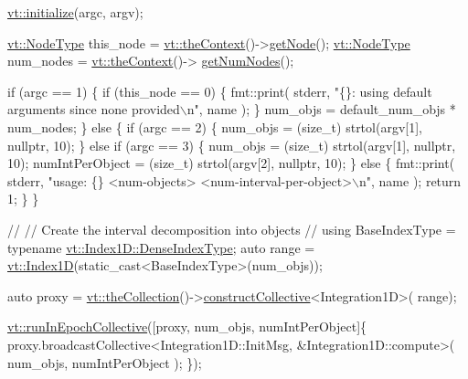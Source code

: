 \begin{DoxyCodeInclude}
  \hyperlink{namespacevt_aaa266774ea8339c58be0202b00fafa62}{vt::initialize}(argc, argv);

  \hyperlink{namespacevt_a866da9d0efc19c0a1ce79e9e492f47e2}{vt::NodeType} this\_node = \hyperlink{namespacevt_a26551fe0e6e6a1371111df5b12c7e92c}{vt::theContext}()->\hyperlink{structvt_1_1ctx_1_1_context_a0d52c263ce8516546a67443d9a86fa5f}{getNode}();
  \hyperlink{namespacevt_a866da9d0efc19c0a1ce79e9e492f47e2}{vt::NodeType} num\_nodes = \hyperlink{namespacevt_a26551fe0e6e6a1371111df5b12c7e92c}{vt::theContext}()->
      \hyperlink{structvt_1_1ctx_1_1_context_a7f41071aadf6d5fa9e1b6c703c5ff19d}{getNumNodes}();

  \textcolor{keywordflow}{if} (argc == 1) \{
    \textcolor{keywordflow}{if} (this\_node == 0) \{
      fmt::print(
        stderr, \textcolor{stringliteral}{"\{\}: using default arguments since none provided\(\backslash\)n"}, name
      );
    \}
    num\_objs = default\_num\_objs * num\_nodes;
  \} \textcolor{keywordflow}{else} \{
    \textcolor{keywordflow}{if} (argc == 2) \{
      num\_objs = (size\_t) strtol(argv[1], \textcolor{keyword}{nullptr}, 10);
    \}
    \textcolor{keywordflow}{else} \textcolor{keywordflow}{if} (argc == 3) \{
      num\_objs = (size\_t) strtol(argv[1], \textcolor{keyword}{nullptr}, 10);
      numIntPerObject = (size\_t) strtol(argv[2], \textcolor{keyword}{nullptr}, 10);
    \}
    \textcolor{keywordflow}{else} \{
      fmt::print(
        stderr,
        \textcolor{stringliteral}{"usage: \{\} <num-objects> <num-interval-per-object>\(\backslash\)n"}, name
      );
      \textcolor{keywordflow}{return} 1;
    \}
  \}

  \textcolor{comment}{//}
  \textcolor{comment}{// Create the interval decomposition into objects}
  \textcolor{comment}{//}
  \textcolor{keyword}{using} BaseIndexType = \textcolor{keyword}{typename} \hyperlink{structvt_1_1index_1_1_dense_index_array_a36698427e28045290d1fb072573275ec}{vt::Index1D::DenseIndexType};
  \textcolor{keyword}{auto} range = \hyperlink{namespacevt_a5540efc78234273e1796fb003fe4d234}{vt::Index1D}(static\_cast<BaseIndexType>(num\_objs));

  \textcolor{keyword}{auto} proxy = \hyperlink{namespacevt_a1c45ce63bfd2c327ff7d76a319a371d8}{vt::theCollection}()->\hyperlink{structvt_1_1vrt_1_1collection_1_1_collection_manager_aa2531212565b2c6f85fa3b55d278bbba}{constructCollective}<Integration1D>(
      range);

  \hyperlink{namespacevt_a2fc4ef34f30b49a1781d765804bfadbb}{vt::runInEpochCollective}([proxy, num\_objs, numIntPerObject]\{
    proxy.broadcastCollective<Integration1D::InitMsg, &Integration1D::compute>(
      num\_objs, numIntPerObject
    );
  \});


\end{DoxyCodeInclude}
